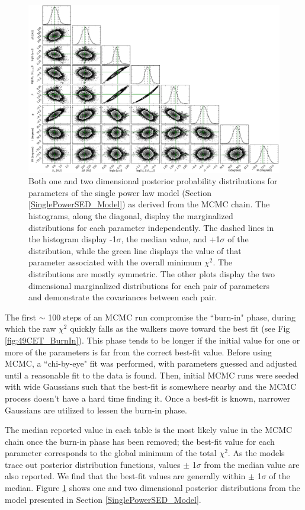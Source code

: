 \begin{figure}
\centering
\includegraphics[width = 1\textwidth]{49CET_140x1000_Triangle_150StepBurnIn.png}
\caption{Both one and two dimensional posterior probability distributions for parameters of the single power law model (Section \ref{SinglePowerSED_Model}) as derived from the MCMC chain. The histograms, along the diagonal, display the marginalized distributions for each parameter independently. The dashed lines in the histogram display -1$\sigma$, the median value, and +1$\sigma$ of the distribution, while the green line displays the value of that parameter associated with the overall minimum $\chi^{2}$. The distributions are mostly symmetric. The other plots display the two dimensional marginalized distributions for each pair of parameters and demonstrate the covariances between each pair.}
\label{fig:49CET_Triangle}
\end{figure}

The first $\sim$ 100 steps of an MCMC run compromise the ``burn-in" phase, during which the raw $\chi^{2}$ quickly falls as the walkers move toward the best fit (see Fig \ref{fig:49CET_BurnIn}). This phase tends to be longer if the initial value for one or more of the parameters is far from the correct best-fit value. Before using MCMC, a ``chi-by-eye" fit was performed, with parameters guessed and adjusted until a reasonable fit to the data is found. Then, initial MCMC runs were seeded with wide Gaussians such that the best-fit is somewhere nearby and the MCMC process doesn't have a hard time finding it. Once a best-fit is known, narrower Gaussians are utilized to lessen the burn-in phase.

The median reported value in each table is the most likely value in the MCMC chain once the burn-in phase has been removed; the best-fit value for each parameter corresponds to the global minimum of the total $\chi^{2}$. As the models trace out posterior distribution functions, values $\pm$ 1$\sigma$ from the median value are also reported. We find that the best-fit values are generally within $\pm$ 1$\sigma$ of the median. Figure \ref{fig:49CET_Triangle} shows one and two dimensional posterior distributions from the model presented in Section \ref{SinglePowerSED_Model}.

